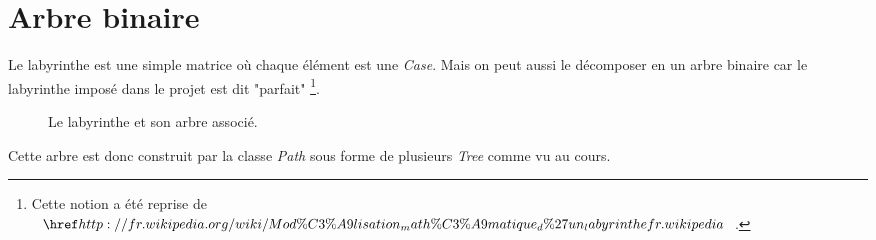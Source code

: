 \section{Arbre binaire}

Le labyrinthe est une simple matrice où chaque élément est une \textit{Case}. Mais on peut aussi le décomposer en un arbre binaire car le labyrinthe imposé dans le projet est dit "parfait" \footnote{Cette notion a été reprise de $\href{http://fr.wikipedia.org/wiki/Mod\%C3\%A9lisation_math\%C3\%A9matique_d\%27un_labyrinthe}{fr.wikipedia}$.}.

\begin{figure}[!h]
  \centering
  \hspace{5pt}
  \hspace{5pt}
  \caption{Le labyrinthe et son arbre associé.}
\end{figure}

Cette arbre est donc construit par la classe \textit{Path} sous forme de plusieurs \textit{Tree} comme vu au cours.